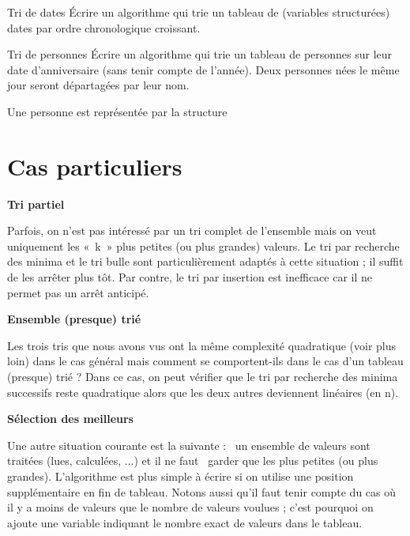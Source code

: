 	\begin{Exercice}{Tri de dates}
			Écrire un algorithme qui trie un tableau de (variables structurées)
			dates par ordre chronologique croissant.
	\end{Exercice}
	
	\begin{Exercice}{Tri de personnes}
			Écrire un algorithme qui trie un tableau de personnes sur leur date
			d'anniversaire (sans tenir compte de
			l'année). Deux personnes nées le même jour seront
			départagées par leur nom.

			Une personne est représentée par la structure 
			
			\bigskip
			
			
	\end{Exercice}


\section{Cas particuliers}

	{\sffamily\bfseries\upshape
	Tri partiel}

		Parfois, on n’est pas intéressé par un tri complet de l’ensemble mais on
		veut uniquement les «~k~» plus petites (ou plus grandes) valeurs. Le
		tri par recherche des minima et le tri bulle sont particulièrement
		adaptés à cette situation ; il suffit de les arrêter plus tôt. Par
		contre, le tri par insertion est inefficace car il ne permet pas un
		arrêt anticipé.

	{\sffamily\bfseries\upshape
	Ensemble (presque) trié}

		Les trois tris que nous avons vus ont la même complexité quadratique
		(voir plus loin) dans le cas général mais comment se comportent-ils
		dans le cas d’un tableau (presque) trié ? Dans ce cas, on peut vérifier
		que le tri par recherche des minima successifs reste quadratique alors
		que les deux autres deviennent linéaires (en n).

	{\sffamily\bfseries\upshape
	Sélection des meilleurs}

		Une autre situation courante est la suivante : \ un ensemble de valeurs
		sont traitées (lues, calculées, ...) et il ne faut \ garder que les
		 plus petites (ou plus grandes).
		L'algorithme est plus simple à écrire si on utilise
		une position supplémentaire en fin de tableau. Notons aussi qu’il faut
		tenir compte du cas où il y a moins de valeurs que le nombre de valeurs
		voulues ; c’est pourquoi on ajoute une variable indiquant le nombre
		exact de valeurs dans le tableau.

